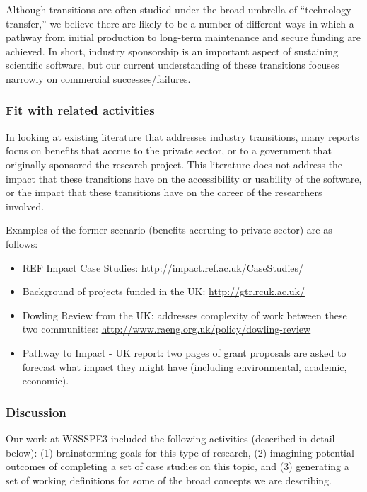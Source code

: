 Although transitions are often studied under the broad umbrella of ``technology
transfer,'' we believe there are likely to be a number of different ways in which
a pathway from initial production to long-term maintenance and secure funding are
achieved. In short, industry sponsorship is an important aspect of sustaining
scientific software, but our current understanding of these transitions focuses
narrowly on commercial successes\slash failures.

\subsubsection{Fit with related activities}

In looking at existing literature that addresses industry transitions, many
reports focus on benefits that accrue to the private sector, or to a government
that originally sponsored the research project. This literature does not address
the impact that these transitions have on the accessibility or usability of the
software, or the impact that these transitions have on the career of the
researchers involved.

Examples of the former scenario (benefits accruing to private sector) are as
follows:
\begin{itemize}

\item REF Impact Case Studies: \url{http://impact.ref.ac.uk/CaseStudies/}

\item Background of projects funded in the UK: \url{http://gtr.rcuk.ac.uk/}

\item Dowling Review from the UK: addresses complexity of work between these two
communities: \url{http://www.raeng.org.uk/policy/dowling-review}

\item Pathway to Impact - UK report: two pages of grant proposals are asked to
forecast what impact they might have (including environmental, academic, economic).

\end{itemize}

\subsubsection{Discussion}

Our work at WSSSPE3 included the following activities (described in detail
below): (1) brainstorming goals for this type of research, (2) imagining
potential outcomes of completing a set of case studies on this topic, and (3)
generating a set of working definitions for some of the broad concepts we are
describing.

